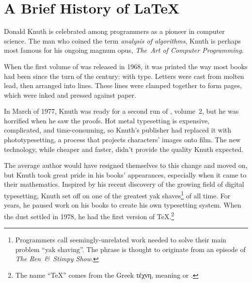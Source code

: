 \chapter{A Brief History of \texorpdfstring{\LaTeX}{LaTeX}}

\label{history}

Donald Knuth is celebrated among programmers as
a pioneer in computer science.
The man who coined the term \emph{analysis of algorithms},
Knuth is perhaps most famous for his ongoing magnum opus,
\textit{The~Art of Computer Programming}.

When the first volume of  was released in 1968,
it was printed the way most books had been since the turn of the century:
with  type.
Letters were cast from molten lead,
then arranged into lines.
These lines were clamped together to form pages,
which were inked and pressed against paper.

In March of 1977, Knuth was ready for a second run of , volume~2,
but he was horrified when he saw the proofs.
Hot metal typesetting is expensive, complicated, and time-consuming,
so Knuth's publisher had replaced it with phototypesetting,
a process that projects characters' images onto film.
The new technology, while cheaper and faster,
didn't provide the quality Knuth
expected.\punckern{}

The average author would have resigned themselves to this change and moved on,
but Knuth took great pride in his books' appearances,
especially when it came to their mathematics.
Inspired by his recent discovery of the growing field of digital typesetting,
Knuth set off on one of the greatest yak shaves\footnote{Programmers
call seemingly-unrelated work needed to solve their main problem
``yak shaving''\quotekern. The phrase is thought to originate from an episode
of \textit{The Ren~\&~Stimpy Show}.\punckern{}}
of all time.
For years, he paused work on his books to create his own
typesetting system.
When the dust settled in 1978, he had the first version of
\TeX.\punckern\footnote{The name ``\TeX{}'' comes from the Greek
{τέχνη},
meaning  or .\punckern{}}

